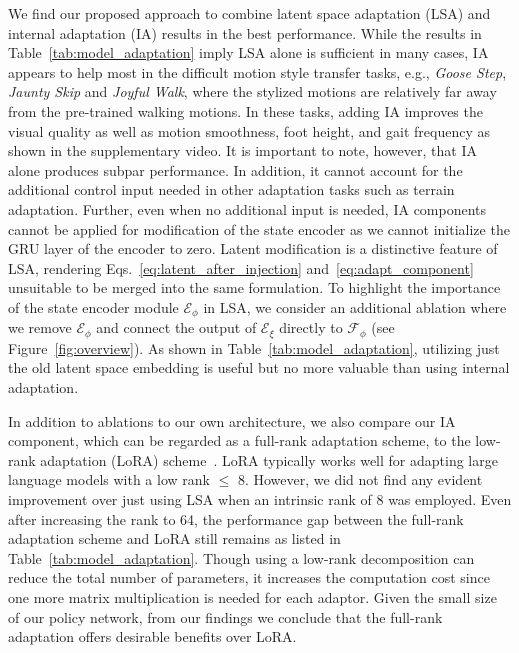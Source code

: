 We find our proposed approach to combine latent space adaptation (LSA) and internal adaptation (IA) results in the best performance. %
While the results in Table~\ref{tab:model_adaptation} imply LSA alone is sufficient in many cases, 
IA appears to help most in the difficult motion style transfer tasks, e.g., \textit{Goose Step}, \textit{Jaunty Skip} and \textit{Joyful Walk}, where the stylized motions are relatively far away from the pre-trained walking motions. 
In these tasks, adding 
IA improves the visual quality as well as motion smoothness, foot height, and gait frequency as shown in the supplementary video. 
It is important to note, however, that IA alone produces subpar performance.
In addition, it cannot account for the additional control input needed in other adaptation tasks such as terrain adaptation. 
Further, even when no additional input is needed, IA components cannot be applied for modification of the state encoder as we cannot initialize the GRU layer of the encoder to zero. Latent modification is a distinctive feature of LSA,  %
rendering Eqs.~\ref{eq:latent_after_injection} and~\ref{eq:adapt_component} unsuitable to be merged into the same formulation.
To highlight the importance of the state encoder module $\mathcal{E}_\phi$ in LSA, we consider an additional ablation 
where we remove $\mathcal{E}_\phi$ and connect the output of $\mathcal{E}_\xi$ directly to $\mathcal{F}_\phi$ (see Figure~\ref{fig:overview}). 
As shown in Table~\ref{tab:model_adaptation}, utilizing just the old latent space embedding is useful but no more valuable than using internal adaptation. 




In addition to %
ablations to our own architecture, 
we also compare our IA component, which can be regarded as a full-rank adaptation scheme, to the low-rank adaptation (LoRA) scheme~\cite{hu2021lora}. 
LoRA typically works well for adapting large language models with a low rank $\leq$ 8.
However, we did not find any evident improvement over just using LSA when an intrinsic rank of 8 was employed.
Even after increasing the rank to 64,
the performance gap between the full-rank adaptation scheme and LoRA still remains as listed in Table~\ref{tab:model_adaptation}. %
Though using a low-rank decomposition can reduce the total number of parameters,
it increases the computation cost since one more matrix multiplication is needed for each adaptor.
Given the small size of our policy network,  %
from our findings we conclude that the full-rank adaptation offers desirable benefits over LoRA. 

